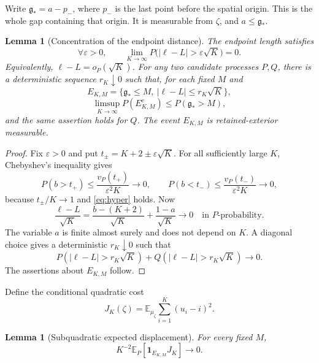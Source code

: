 \documentclass[11pt,reqno]{amsart}
\numberwithin{equation}{section}
\newtheorem{lemma}[theorem]{Lemma}
\theoremstyle{definition}
\theoremstyle{remark}
\newcommand{\E}{\mathbb E}
\newcommand{\1}{\mathbf 1}
\newcommand{\gap}{\mathfrak g}
\begin{document}
Write $\gap_*=a-p_-$, where $p_-$ is the last point before the spatial
origin. This is the whole gap containing that origin. It is measurable
from $\zeta$, and $a\le\gap_*$.

\begin{samepage}
\begin{lemma}[Concentration of the endpoint distance]\label{lem:length}
The endpoint length satisfies
\begin{equation}\label{eq:length-probability}
\forall\varepsilon>0,\qquad
\lim_{K\to\infty}P\bigl(|\ell-L|>\varepsilon\sqrt K\bigr)=0.
\end{equation}
Equivalently, $\ell-L=o_P(\sqrt K)$. For any two candidate processes $P,Q$,
there is a deterministic sequence $r_K\downarrow0$ such that, for each
fixed $M$ and
\begin{equation}\label{eq:good}
E_{K,M}=\{\gap_*\le M,\ |\ell-L|\le r_K\sqrt K\},
\end{equation}
\[
\limsup_{K\to\infty}P(E_{K,M}^c)\le P(\gap_*>M),
\]
and the same assertion holds for $Q$.
The event $E_{K,M}$ is retained-exterior measurable.
\end{lemma}
\end{samepage}

\begin{proof}
Fix $\varepsilon>0$ and put
$t_\pm=K+2\pm\varepsilon\sqrt K$. For all sufficiently large $K$,
Chebyshev's inequality gives
\[
P(b>t_+)\le\frac{v_P(t_+)}{\varepsilon^2K}\longrightarrow0,
\qquad
P(b<t_-)\le\frac{v_P(t_-)}{\varepsilon^2K}\longrightarrow0,
\]
because $t_\pm/K\to1$ and \eqref{eq:hyper} holds. Now
\[
\frac{\ell-L}{\sqrt K}
 =\frac{b-(K+2)}{\sqrt K}+\frac{1-a}{\sqrt K}
 \longrightarrow0\quad\text{in }P\text{-probability}.
\]
The variable $a$ is finite almost surely and does not depend on $K$.
A diagonal choice gives a deterministic $r_K\downarrow0$ such that
\[
P(|\ell-L|>r_K\sqrt K)+Q(|\ell-L|>r_K\sqrt K)\longrightarrow0.
\]
The assertions about $E_{K,M}$ follow.
\end{proof}

Define the conditional quadratic cost
\begin{equation}\label{eq:J}
J_K(\zeta)=\E_{\mu_\zeta}\sum_{i=1}^K(u_i-i)^2.
\end{equation}

\begin{samepage}
\begin{lemma}[Subquadratic expected displacement]\label{lem:quadratic}
For every fixed $M$,
\begin{equation}\label{eq:J-small}
K^{-2}\E_P[\1_{E_{K,M}}J_K]\longrightarrow0.
\end{equation}
\end{lemma}
\end{samepage}
\end{document}
